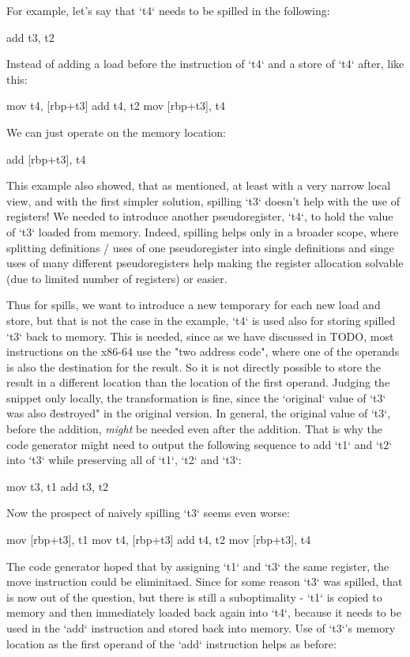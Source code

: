 For example, let's say that `t4` needs to be spilled in the following:

\begtt
add t3, t2
\endtt

Instead of adding a load before the instruction of `t4` and a store of `t4`
after, like this:

\begtt
mov t4, [rbp+t3]
add t4, t2
mov [rbp+t3], t4
\endtt

We can just operate on the memory location:

\begtt
add [rbp+t3], t4
\endtt

This example also showed, that as mentioned, at least with a very narrow local
view, and with the first simpler solution, spilling `t3` doesn't help with the
use of registers! We needed to introduce another pseudoregister, `t4`, to hold
the value of `t3` loaded from memory. Indeed, spilling helps only in a broader
scope, where splitting definitions / uses of one pseudoregister into single
definitions and singe uses of many different pseudoregisters help making the
register allocation solvable (due to limited number of registers) or easier.

Thus for spills, we want to introduce a new temporary for each new load and
store, but that is not the case in the example, `t4` is used also for storing
spilled `t3` back to memory. This is needed, since as we have discussed in TODO,
most instructions on the x86-64 use the "two address code", where one of the
operands is also the destination for the result. So it is not directly possible
to store the result in a different location than the location of the first
operand. Judging the snippet only locally, the transformation is fine, since the
`original` value of `t3` was also \"destroyed" in the original version. In
general, the original value of `t3`, before the addition, {\em might} be needed
even after the addition. That is why the code generator might need to output the
following sequence to add `t1` and `t2` into `t3` while preserving all of `t1`,
`t2` and `t3`:

\begtt
mov t3, t1
add t3, t2
\endtt

Now the prospect of naively spilling `t3` seems even worse:

\begtt
mov [rbp+t3], t1
mov t4, [rbp+t3]
add t4, t2
mov [rbp+t3], t4
\endtt

The code generator hoped that by assigning `t1` and `t3` the same register, the
move instruction could be eliminitaed. Since for some reason `t3` was spilled,
that is now out of the question, but there is still a suboptimality - `t1` is
copied to memory and then immediately loaded back again into `t4`, because it
needs to be used in the `add` instruction and stored back into memory. Use of
`t3`'s memory location as the first operand of the `add` instruction helps as
before:

